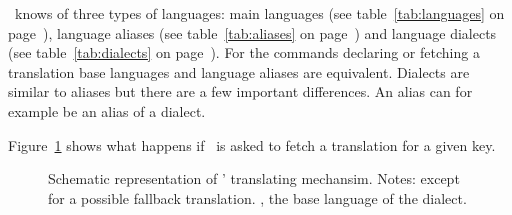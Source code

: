 \documentclass[DIV11,toc=index,toc=bib,numbers=noendperiod]{cnpkgdoc}
\newlength\nodewidth
\begin{document}
\translations\ knows of three types of languages: main languages (see
table~\ref{tab:languages} on page~\pageref{tab:languages}), language aliases
(see table~\ref{tab:aliases} on page~\pageref{tab:aliases}) and language
dialects (see table~\ref{tab:dialects} on page~\pageref{tab:dialects}).  For
the commands declaring or fetching a translation base languages and language
aliases are equivalent.  Dialects are similar to aliases but there are a few
important differences.  An alias can for example be an alias of a dialect.

Figure~\ref{fig:scheme} shows what happens if \translations\ is asked to fetch
a translation for a given key.

\begin{figure}[htbp]
  \centering
  \caption{Schematic representation of \translations' translating
    mechansim. Notes:  except for a possible fallback
    translation.  \ie, the base language of the dialect.}
  \label{fig:scheme}
\end{figure}
\end{document}
